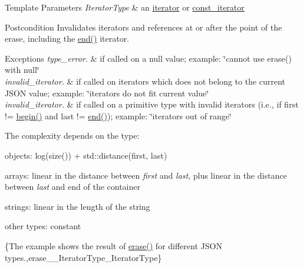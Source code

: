 \begin{DoxyTemplParams}{Template Parameters}
{\em Iterator\+Type} & an \mbox{\hyperlink{classnlohmann_1_1basic__json_a099316232c76c034030a38faa6e34dca}{iterator}} or \mbox{\hyperlink{classnlohmann_1_1basic__json_a41a70cf9993951836d129bb1c2b3126a}{const\+\_\+iterator}}\\
\hline
\end{DoxyTemplParams}
\begin{DoxyPostcond}{Postcondition}
Invalidates iterators and references at or after the point of the erase, including the {\ttfamily \mbox{\hyperlink{classnlohmann_1_1basic__json_a13e032a02a7fd8a93fdddc2fcbc4763c}{end()}}} iterator.
\end{DoxyPostcond}

\begin{DoxyExceptions}{Exceptions}
{\em type\+\_\+error.} & if called on a {\ttfamily null} value; example\+: {\ttfamily \char`\"{}cannot use
erase() with null\char`\"{}} \\
\hline
{\em invalid\+\_\+iterator.} & if called on iterators which does not belong to the current J\+S\+ON value; example\+: {\ttfamily \char`\"{}iterators do not fit current value\char`\"{}} \\
\hline
{\em invalid\+\_\+iterator.} & if called on a primitive type with invalid iterators (i.\+e., if {\ttfamily first != \mbox{\hyperlink{classnlohmann_1_1basic__json_a0ff28dac23f2bdecee9564d07f51dcdc}{begin()}}} and {\ttfamily last != \mbox{\hyperlink{classnlohmann_1_1basic__json_a13e032a02a7fd8a93fdddc2fcbc4763c}{end()}}}); example\+: {\ttfamily \char`\"{}iterators out of range\char`\"{}}\\
\hline
\end{DoxyExceptions}
The complexity depends on the type\+:
\begin{DoxyItemize}
\item objects\+: {\ttfamily log(size()) + std\+::distance(first, last)}
\item arrays\+: linear in the distance between {\itshape first} and {\itshape last}, plus linear in the distance between {\itshape last} and end of the container
\item strings\+: linear in the length of the string
\item other types\+: constant
\end{DoxyItemize}

\{The example shows the result of {\ttfamily \mbox{\hyperlink{classnlohmann_1_1basic__json_a068a16e76be178e83da6a192916923ed}{erase()}}} for different J\+S\+ON types.,erase\+\_\+\+\_\+\+Iterator\+Type\+\_\+\+Iterator\+Type\}

